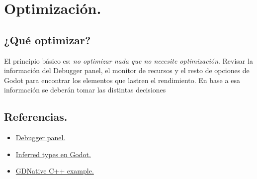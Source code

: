 
\section{Optimización.}\label{optimizacion:optimizacion}



\subsection{¿Qué optimizar?}
El principio básico es: \emph{no optimizar nada que no necesite optimización}.
Revisar la información del Debugger panel, el monitor de recursos y el resto de opciones de Godot para encontrar los elementos que lastren el rendimiento. En base a esa información se deberán tomar las distintas decisiones 

\subsection{Referencias.}
\begin{itemize}
\item \href{https://docs.godotengine.org/en/stable/tutorials/debug/debugger_panel.html}{Debugger panel.}
\item \href{https://docs.godotengine.org/en/stable/getting_started/scripting/gdscript/gdscript_styleguide.html#inferred-types}{Inferred types en Godot.}
\item \href{https://docs.godotengine.org/en/stable/tutorials/plugins/gdnative/gdnative-cpp-example.html}{GDNative C++ example.}
\end{itemize}
